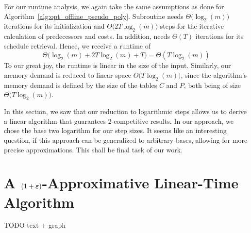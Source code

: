 For our runtime analysis, we again take the same assumptions as done for Algorithm~\ref{alg:opt_offline_pseudo_poly}. Subroutine  needs $\Theta\bigl(\log_2(m)\bigr)$ iterations for its initialization and $\Theta\bigl(2T\log_2(m)\bigr)$ steps for the iterative calculation of predecessors and costs. In addition,  needs $\Theta(T)$ iterations for its schedule retrieval. Hence, we receive a runtime of 
\begin{equation*}
	\Theta\bigl(\log_2(m)+2T\log_2(m)+T\bigr)=\Theta(T\log_2(m))
\end{equation*}
To our great joy, the runtime is linear in the size of the input. Similarly, our memory demand is reduced to linear space $\Theta\bigl(T\log_2(m)\bigr)$, since the algorithm's memory demand is defined by the size of the tables $C$ and $P$, both being of size $\Theta\bigl(T\log_2(m)\bigr)$.

In this section, we saw that our reduction to logarithmic steps allows us to derive a linear algorithm that guarantees 2-competitive results. In our approach, we chose the base two logarithm for our step sizes. It seems like an interesting question, if this approach can be generalized to arbitrary bases, allowing for more precise approximations. This shall be final task of our work.

\section{A $(1+\boldsymbol\varepsilon)$-Approximative Linear-Time Algorithm}
TODO text + graph

